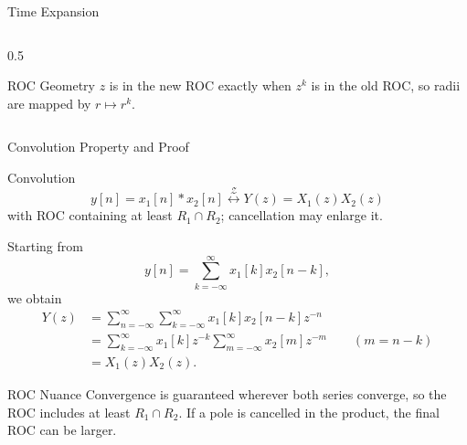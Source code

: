 \begin{frame}[t]{Time Expansion}
\begin{columns}[T]
\begin{column}{0.5\textwidth}
\begin{center}
        \vspace{0.06cm}
      \end{center}

      \begin{insightbox}{ROC Geometry}
        $z$ is in the new ROC exactly when $z^k$ is in the old ROC,
        so radii are mapped by $r\mapsto r^k$.
      \end{insightbox}
    \end{column}
  \end{columns}
\end{frame}

\begin{frame}[t]{Convolution Property and Proof}
  \scriptsize
  \begin{conceptbox}{Convolution}
    \[
      y[n]=x_1[n]*x_2[n]
      \stackrel{\mathcal{Z}}{\longleftrightarrow}
      Y(z)=X_1(z)X_2(z)
    \]
    with ROC containing at least $R_1\cap R_2$; cancellation may enlarge it.
  \end{conceptbox}

  Starting from
  \[
    y[n]=\sum_{k=-\infty}^{\infty}x_1[k]x_2[n-k],
  \]
  we obtain
  \[
    \begin{aligned}
      Y(z)
      &=\sum_{n=-\infty}^{\infty}
      \sum_{k=-\infty}^{\infty}
      x_1[k]x_2[n-k]z^{-n}\\
      &=\sum_{k=-\infty}^{\infty}x_1[k]z^{-k}
      \sum_{m=-\infty}^{\infty}x_2[m]z^{-m}
      \qquad (m=n-k)\\
      &=X_1(z)X_2(z).
    \end{aligned}
  \]

  \begin{insightbox}{ROC Nuance}
    Convergence is guaranteed wherever both series converge, so the ROC includes
    at least $R_1\cap R_2$. If a pole is cancelled in the product, the final ROC can be larger.
  \end{insightbox}
\end{frame}

